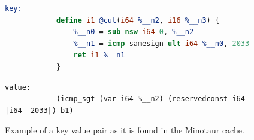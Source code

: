 		\begin{figure}[t]
		\centering
		\caption{\label{fig:kv} Example of a key value pair as it is found in the Minotaur cache.}
		\begin{lstlisting}[language=llvm, basicstyle=\footnotesize\tt]
		key:
			define i1 @cut(i64 %__n2, i16 %__n3) {
				%__n0 = sub nsw i64 0, %__n2
				%__n1 = icmp samesign ult i64 %__n0, 2033
				ret i1 %__n1
			}
		\end{lstlisting}
		\begin{lstlisting}[basicstyle=\small\tt]
		value:
			(icmp_sgt (var i64 %__n2) (reservedconst i64 |i64 -2033|) b1)	
		\end{lstlisting}
	 	\end{figure}
